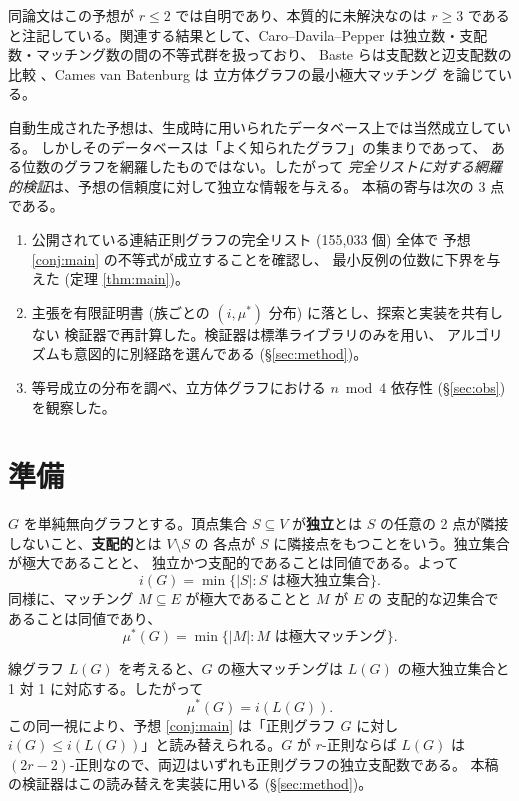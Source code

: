 \documentclass[paper=a4,fontsize=10.5pt,jafontsize=10.5pt]{jlreq}
\theoremstyle{plain}
\theoremstyle{definition}
\begin{document}
同論文はこの予想が $r \le 2$ では自明であり、本質的に未解決なのは $r \ge 3$
であると注記している。関連する結果として、Caro--Davila--Pepper \cite{carodavilapepper}
は独立数・支配数・マッチング数の間の不等式群を扱っており、
Baste らは支配数と辺支配数の比較 \cite{bfhmr}、Cames van Batenburg は
立方体グラフの最小極大マッチング \cite{batenburg} を論じている。

自動生成された予想は、生成時に用いられたデータベース上では当然成立している。
しかしそのデータベースは「よく知られたグラフ」の集まりであって、
ある位数のグラフを網羅したものではない。したがって
\emph{完全リストに対する網羅的検証}は、予想の信頼度に対して独立な情報を与える。
本稿の寄与は次の 3 点である。

\begin{enumerate}
\item 公開されている連結正則グラフの完全リスト (155,033 個) 全体で
      予想 \ref{conj:main} の不等式が成立することを確認し、
      最小反例の位数に下界を与えた (定理 \ref{thm:main})。
\item 主張を有限証明書 (族ごとの $(i,\mu^*)$ 分布) に落とし、探索と実装を共有しない
      検証器で再計算した。検証器は標準ライブラリのみを用い、
      アルゴリズムも意図的に別経路を選んである (\S\ref{sec:method})。
\item 等号成立の分布を調べ、立方体グラフにおける $n \bmod 4$ 依存性
      (\S\ref{sec:obs}) を観察した。
\end{enumerate}

\section{準備}

$G$ を単純無向グラフとする。頂点集合 $S \subseteq V$ が\textbf{独立}とは
$S$ の任意の 2 点が隣接しないこと、\textbf{支配的}とは $V \setminus S$ の
各点が $S$ に隣接点をもつことをいう。独立集合が極大であることと、
独立かつ支配的であることは同値である。よって
\[ i(G) = \min\{|S| : S \text{ は極大独立集合}\} . \]
同様に、マッチング $M \subseteq E$ が極大であることと $M$ が $E$ の
支配的な辺集合であることは同値であり、
\[ \mu^*(G) = \min\{|M| : M \text{ は極大マッチング}\} . \]

線グラフ $L(G)$ を考えると、$G$ の極大マッチングは $L(G)$ の極大独立集合と
1 対 1 に対応する。したがって
\begin{equation}\label{eq:line}
\mu^*(G) = i(L(G)) .
\end{equation}
この同一視により、予想 \ref{conj:main} は「正則グラフ $G$ に対し
$i(G) \le i(L(G))$」と読み替えられる。$G$ が $r$-正則ならば $L(G)$ は
$(2r-2)$-正則なので、両辺はいずれも正則グラフの独立支配数である。
本稿の検証器はこの読み替えを実装に用いる (\S\ref{sec:method})。
\end{document}

